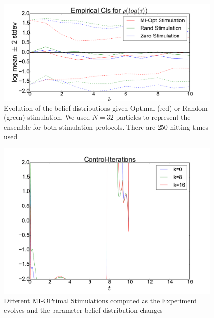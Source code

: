 \documentclass{article}
\begin{document}
\begin{figure}[htp]
\begin{center}
  \includegraphics[width=\textwidth]{Figs/HTOnlineEstimator/single_experiment_example_ensemble_distn_evolution.pdf}
  \caption[labelInTOC]{Evolution of the belief distributions given Optimal
  (red) or Random (green) stimulation. We used $N=32$ particles to represent
  the ensemble for both stimulation protocols. There are 250 hitting times used}
  \label{fig:example_miopt_vs_rand_ensemble_evolution}
\end{center}
\end{figure}
\begin{figure}[htp]
\begin{center}
  \includegraphics[width=\textwidth]{Figs/HTOnlineEstimator/single_experiment_example_controls_evolution.pdf}
  \caption[labelInTOC]{Different MI-OPtimal Stimulations computed 
  as the Experiment evolves and the parameter belief distribution changes}
  \label{fig:example_miopt_controls_evolution}
\end{center}
\end{figure}
 
\end{document}
